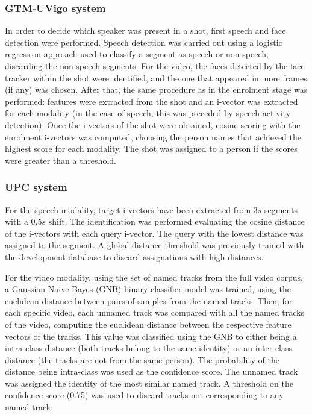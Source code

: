 \subsubsection{GTM-UVigo system}

In order to decide which speaker was present in a shot, first speech and face detection were performed. Speech detection was carried out using a logistic regression approach
used to classify a segment as speech or non-speech, discarding the non-speech segments. For the video, the faces detected by the face tracker within the shot were identified, 
and the one that appeared in more frames (if any) was chosen. After that, the same procedure as in the enrolment stage was performed: features were extracted from the shot
and an i-vector was extracted for each modality (in the case of speech, this was preceded by speech activity detection). Once the i-vectors of the shot were obtained,
cosine scoring with the enrolment i-vectors was computed, choosing the person names that achieved the highest score for each modality. The shot was assigned to
a person if 
the scores were greater than a threshold.

\subsubsection{UPC system}

For the speech modality, target i-vectors have been extracted from $3s$ segments with a $0.5s$ shift. The identification was performed evaluating the cosine distance of the i-vectors with each query i-vector. The query with the lowest distance was assigned to the segment. A global distance threshold was previously trained with the development database to discard assignations with high distances.

For the video modality, using the set of named tracks from the full video corpus, a Gaussian Naive Bayes (GNB) binary classifier model was trained, using the euclidean distance between pairs of samples from the named tracks. Then, for each specific video, each unnamed track was compared with all the named tracks of the video, computing the euclidean distance between the respective feature vectors of the tracks. This value was classified using the GNB to either being a intra-class distance (both tracks belong to the same identity) or an inter-class distance (the tracks are not from the same person). The probability of the distance being intra-class was used as the confidence score. The unnamed track was assigned the identity of the most similar named track. A threshold on the confidence score (0.75) was used to discard tracks not corresponding to any named track.
